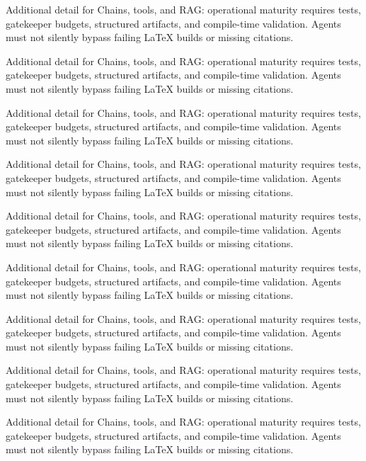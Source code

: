 Additional detail for Chains, tools, and RAG: operational maturity requires tests, gatekeeper budgets, structured artifacts, and compile-time validation. Agents must not silently bypass failing LaTeX builds or missing citations. \cite{crewai2024} \cite{langgraph2024}

Additional detail for Chains, tools, and RAG: operational maturity requires tests, gatekeeper budgets, structured artifacts, and compile-time validation. Agents must not silently bypass failing LaTeX builds or missing citations. \cite{crewai2024} \cite{langgraph2024}

Additional detail for Chains, tools, and RAG: operational maturity requires tests, gatekeeper budgets, structured artifacts, and compile-time validation. Agents must not silently bypass failing LaTeX builds or missing citations. \cite{crewai2024} \cite{langgraph2024}

Additional detail for Chains, tools, and RAG: operational maturity requires tests, gatekeeper budgets, structured artifacts, and compile-time validation. Agents must not silently bypass failing LaTeX builds or missing citations. \cite{crewai2024} \cite{langgraph2024}

Additional detail for Chains, tools, and RAG: operational maturity requires tests, gatekeeper budgets, structured artifacts, and compile-time validation. Agents must not silently bypass failing LaTeX builds or missing citations. \cite{crewai2024} \cite{langgraph2024}

Additional detail for Chains, tools, and RAG: operational maturity requires tests, gatekeeper budgets, structured artifacts, and compile-time validation. Agents must not silently bypass failing LaTeX builds or missing citations. \cite{crewai2024} \cite{langgraph2024}

Additional detail for Chains, tools, and RAG: operational maturity requires tests, gatekeeper budgets, structured artifacts, and compile-time validation. Agents must not silently bypass failing LaTeX builds or missing citations. \cite{crewai2024} \cite{langgraph2024}

Additional detail for Chains, tools, and RAG: operational maturity requires tests, gatekeeper budgets, structured artifacts, and compile-time validation. Agents must not silently bypass failing LaTeX builds or missing citations. \cite{crewai2024} \cite{langgraph2024}

Additional detail for Chains, tools, and RAG: operational maturity requires tests, gatekeeper budgets, structured artifacts, and compile-time validation. Agents must not silently bypass failing LaTeX builds or missing citations. \cite{crewai2024} \cite{langgraph2024}

